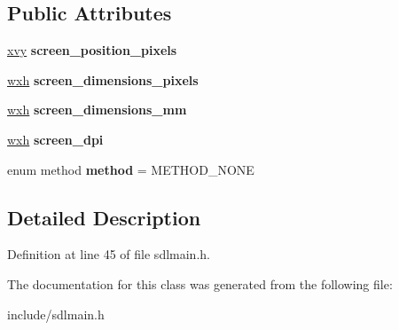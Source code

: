 \subsection*{Public Attributes}
\begin{DoxyCompactItemize}
\item 
\hypertarget{classScreenSizeInfo_a5cef747ac327220c235345c52c9cba05}{\hyperlink{structScreenSizeInfo_1_1xvy}{xvy} {\bfseries screen\-\_\-position\-\_\-pixels}}\label{classScreenSizeInfo_a5cef747ac327220c235345c52c9cba05}

\item 
\hypertarget{classScreenSizeInfo_ac42ff4475e23dbf92bca2c0ea9d2603b}{\hyperlink{structScreenSizeInfo_1_1wxh}{wxh} {\bfseries screen\-\_\-dimensions\-\_\-pixels}}\label{classScreenSizeInfo_ac42ff4475e23dbf92bca2c0ea9d2603b}

\item 
\hypertarget{classScreenSizeInfo_afe19e45bf6dd0785c5b4bd7db2f57570}{\hyperlink{structScreenSizeInfo_1_1wxh}{wxh} {\bfseries screen\-\_\-dimensions\-\_\-mm}}\label{classScreenSizeInfo_afe19e45bf6dd0785c5b4bd7db2f57570}

\item 
\hypertarget{classScreenSizeInfo_a5e130e26e512ad843178a620246efcde}{\hyperlink{structScreenSizeInfo_1_1wxh}{wxh} {\bfseries screen\-\_\-dpi}}\label{classScreenSizeInfo_a5e130e26e512ad843178a620246efcde}

\item 
\hypertarget{classScreenSizeInfo_a727dd1a26961b8cc5dd3856604c8fa35}{enum method {\bfseries method} = M\-E\-T\-H\-O\-D\-\_\-\-N\-O\-N\-E}\label{classScreenSizeInfo_a727dd1a26961b8cc5dd3856604c8fa35}

\end{DoxyCompactItemize}


\subsection{Detailed Description}


Definition at line 45 of file sdlmain.\-h.



The documentation for this class was generated from the following file\-:\begin{DoxyCompactItemize}
\item 
include/sdlmain.\-h\end{DoxyCompactItemize}
